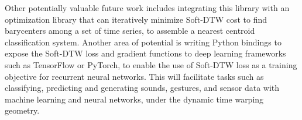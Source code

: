\documentclass[12pt, letterpaper]{article}
\begin{document}
Other potentially valuable future work includes integrating this library with an
optimization library that can iteratively minimize Soft-DTW cost to find
barycenters among a set of time series, to assemble a nearest centroid
classification system. Another area of potential is writing Python bindings to
expose the Soft-DTW loss and gradient functions to deep learning frameworks such
as TensorFlow or PyTorch, to enable the use of Soft-DTW loss as a training
objective for recurrent neural networks. This will facilitate tasks such as
classifying, predicting and generating sounds, gestures, and sensor data with
machine learning and neural networks, under the dynamic time warping geometry.

\printbibliography[]
\end{document}
